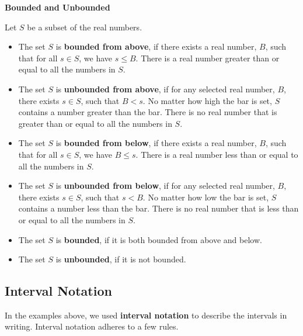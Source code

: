 \documentclass{ximera}
\begin{document}
\begin{definition} \item \textbf{\textcolor{green!50!black}{Bounded and Unbounded}}

Let $S$ be a subset of the real numbers.


\begin{itemize}
\item The set $S$ is \textbf{bounded from above}, if there exists a real number, $B$, such that for all $s \in S$, we have $s \leq B$.  There is a real number greater than or equal to all the numbers in $S$.  

\item The set $S$ is \textbf{unbounded from above}, if for any selected real number, $B$, there exists $s \in S$, such that $B < s$. No matter how high the bar is set, $S$ contains a number greater than the bar.  There is no real number that is greater than or equal to all the numbers in $S$. 

\item The set $S$ is \textbf{bounded from below}, if there exists a real number, $B$, such that for all $s \in S$, we have $B \leq s$.  There is a real number less than or equal to all the numbers in $S$.  

\item The set $S$ is \textbf{unbounded from below}, if for any selected real number, $B$, there exists $s \in S$, such that $s < B$. No matter how low the bar is set, $S$ contains a number less than the bar.  There is no real number that is less than or equal to all the numbers in $S$.  

\item The set $S$ is \textbf{bounded}, if it is both bounded from above and below.  

\item The set $S$ is \textbf{unbounded}, if it is not bounded.  
\end{itemize}


\end{definition}



\newpage


\subsection*{Interval Notation}

\hfill\break

In the examples above, we used \textbf{interval notation} to describe the intervals in writing. Interval notation adheres to a few rules.
\end{document}
